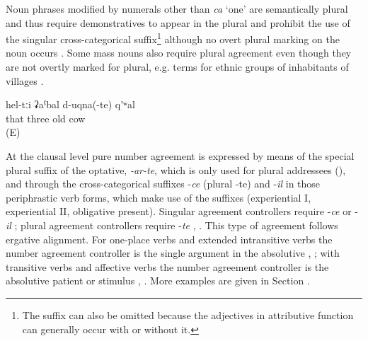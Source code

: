 Noun phrases modified by numerals other than \textit{ca} `one' are semantically plural and thus require demonstratives to appear in the plural and prohibit the use of the singular cross-categorical suffix\footnote{The suffix can also be omitted because the adjectives in attributive function can generally occur with or without it.} although no overt plural marking on the noun occurs . Some mass nouns also require plural agreement even though they are not overtly marked for plural, e.g. terms for ethnic groups of inhabitants of villages .

\begin{exe}
	\ex	\label{ex:‎‎‎three old cowsAGREE}
	\gll	hel-tːi ʡaˁbal	d-uqna(-te)	q'ʷal\\
		that three old 	cow\\
	\glt	{} (E)
\end{exe}

At the clausal level pure number agreement is expressed by means of the special plural suffix of the optative, \textit{-ar-te}, which is only used for plural addressees  (), and through the cross-categorical suffixes -\textit{ce} (plural -te) and -\textit{il} in those periphrastic verb forms, which make use of the suffixes (experiential I, experiential II, obligative present). Singular agreement controllers require -\textit{ce}  or -\textit{il} ; plural agreement controllers require -\textit{te} , . This type of agreement follows ergative alignment. For one-place verbs and extended intransitive verbs the number agreement controller is the single argument in the absolutive , ; with transitive verbs and affective verbs the number agreement controller is the absolutive patient or stimulus , . More examples are given in Section .

